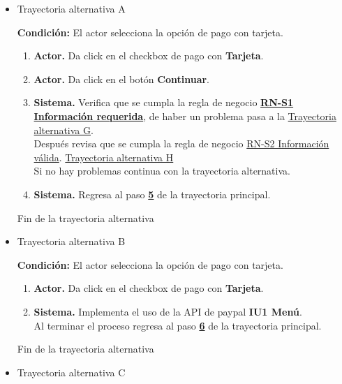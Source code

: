 \begin{itemize}
	
	\item \hypertarget{TAA:CU4}{Trayectoria alternativa A}
	
	\noindent \textbf{Condición:} El actor selecciona la opción de pago con tarjeta.
	
	\begin{enumerate}
		\item \textbf{Actor.} Da click en el checkbox de pago con \textbf{Tarjeta}.
		\item \textbf{Actor.} Da click en el botón \textbf{Continuar}.
		\item \textbf{Sistema.} Verifica que se cumpla la regla de negocio \hyperlink{RN:S1:InfoRequerida}{\textbf{RN-S1 Información requerida}}, de haber un problema pasa a la \hyperlink{TAC:CU3}{Trayectoria alternativa G}.
		\\Después revisa que se cumpla la regla de negocio \hyperlink{RN:S2:InfoValida}{RN-S2 Información válida}. \hyperlink{TAD:CU3}{Trayectoria alternativa H}
		\\Si no hay problemas continua con la trayectoria alternativa.
		\item \textbf{Sistema.} Regresa al paso \hyperlink{p5}{\textbf{5}} de la trayectoria principal.
		
	\end{enumerate}
	
	Fin de la trayectoria alternativa
	
	\item \hypertarget{TAB:CU4}{Trayectoria alternativa B}
	
	\noindent \textbf{Condición:} El actor selecciona la opción de pago con tarjeta.
	
	\begin{enumerate}
		\item \textbf{Actor.} Da click en el checkbox de pago con \textbf{Tarjeta}.
		\item \textbf{Sistema.} Implementa el uso de la API de paypal  \textbf{IU1 Menú}.
		\\ Al terminar el proceso regresa al paso \hyperlink{p6}{\textbf{6}} de la trayectoria principal.
	\end{enumerate}
	
	Fin de la trayectoria alternativa
	
	\item \hypertarget{TAC:CU4}{Trayectoria alternativa C}
	

\end{itemize}
